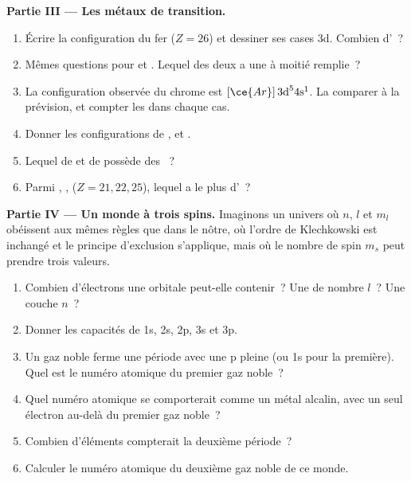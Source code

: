 \begin{problem}
\medskip
\noindent\textbf{Partie III --- Les métaux de transition.}
\begin{enumerate}[resume]
  \item Écrire la configuration du fer ($Z = 26$) et dessiner ses cases
        3d. Combien d'~?
  \item Mêmes questions pour  et . Lequel des
        deux a une  à moitié remplie~?
  \item La configuration observée du chrome est $[\ce{Ar}]\,3\text{d}^5
        4\text{s}^1$. La comparer à la prévision, et compter les
         dans chaque cas.
  \item Donner les configurations de ,  et .
  \item Lequel de  et de  possède des ~?
  \item Parmi , ,  ($Z = 21, 22, 25$),
        lequel a le plus d'~?
\end{enumerate}

\medskip
\noindent\textbf{Partie IV --- Un monde à trois spins.}
Imaginons un univers où $n$, $l$ et $m_l$ obéissent aux mêmes règles que
dans le nôtre, où l'ordre de Klechkowski est inchangé et le principe
d'exclusion s'applique, mais où le nombre de spin $m_s$ peut prendre
trois valeurs.
\begin{enumerate}[resume]
  \item Combien d'électrons une orbitale peut-elle contenir~? Une
         de nombre $l$~? Une couche $n$~?
  \item Donner les capacités de 1s, 2s, 2p, 3s et 3p.
  \item Un gaz noble ferme une période avec une  p pleine
        (ou 1s pour la première). Quel est le numéro atomique du premier
        gaz noble~?
  \item Quel numéro atomique se comporterait comme un métal alcalin,
        avec un seul électron au-delà du premier gaz noble~?
  \item Combien d'éléments compterait la deuxième période~?
  \item Calculer le numéro atomique du deuxième gaz noble de ce monde.
\end{enumerate}
\end{problem}
